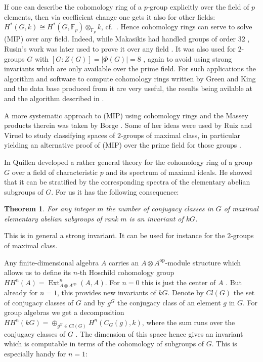 \documentclass[11pt, a4paper]{amsart}
\newtheorem{theorem}{Theorem}[section]
\theoremstyle{definition}
\begin{document}
If one can describe the cohomology ring of a $p$-group explicitly over the field of $p$ elements, then via coefficient change one gets it also for other fields: $H^*(G, k) \cong H^*(G, \mathbb{F}_p) \otimes_{\mathbb{F}_p}k$, cf.\ \cite[Section 3.4]{Evens91}. Hence cohomology rings can serve to solve (MIP) over any field. Indeed, while Makasikis had handled groups of order $32$ \cite{Makasikis}, Rusin's work was later used to prove it over any field \cite[Lemma 3.7]{NavarroSambale}. It was also used for $2$-groups $G$ with $[G:Z(G)] = |\Phi(G)| = 8$ \cite{MargolisSakuraiStanojkovski21}, again to avoid using strong invariants which are only available over the prime field. For such applications the algorithm and software to compute cohomology rings written by Green and King and the data base produced from it are very useful, the results being avilable at \cite{GreenKingWebsite} and the algorithm described in \cite{GreenKing11}.

A more systematic approach to (MIP) using cohomology rings and the Massey products therein was taken by Borge \cite{Borge04}. Some of her ideas were used by Ruiz and Viruel to study classifying spaces of $2$-groups of maximal class, in particular yielding an alternative proof of (MIP) over the prime field for those groups \cite{RuizViruel}.

In \cite{Quillen71} Quillen developed a rather general theory for the cohomology ring of a group $G$ over a field of characteristic $p$ and its spectrum of maximal ideals. He showed that it can be stratified by the corresponding spectra of the elementary abelian subgroups of $G$. For us it has the following consequence:

\begin{theorem}
For any integer $m$ the number of conjugacy classes in $G$ of maximal elementary abelian subgroups of rank $m$ is an invariant of $kG$.
\end{theorem}

This is in general a strong invariant. It can be used for instance for the $2$-groups of maximal class.

Any finite-dimensional algebra $A$ carries an $A \otimes A^{\text{op}}$-module structure which allows us to define its $n$-th Hoschild cohomology group $HH^n(A) = \operatorname{Ext}^n_{A \otimes A^{\text{op}}}(A, A)$. For $n = 0$ this is just the center of $A$ \cite[Section 1.2]{WitherspoonHochschildBook}. But already for $n = 1$, this provides new invariants of $kG$. Denote by $Cl(G)$ the set of conjugacy classes of $G$ and by $g^G$ the conjugacy class of an element $g$ in $G$. For group algebras we get a decomposition $HH^n(kG) = \oplus_{g^G \in Cl(G)} H^n(C_G(g), k)$, where the sum runs over the conjugacy classes of $G$ \cite[Section 9.5]{WitherspoonHochschildBook}. The dimension of this space hence gives an invariant which is computable in terms of the cohomology of subgroups of $G$. This is especially handy for $n = 1$:
\end{document}

